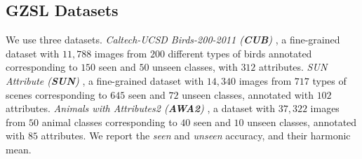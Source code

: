 \subsection{GZSL Datasets}

We use three datasets. \textit{Caltech-UCSD Birds-200-2011 (\textbf{CUB})} \cite{CUB}, a fine-grained dataset with $11,788$ images from $200$ different types of birds annotated corresponding to $150$ seen and $50$ unseen classes, with $312$ attributes. \textit{SUN Attribute (\textbf{SUN})} \cite{SUN}, a fine-grained dataset with $14,340$ images from $717$ types of scenes corresponding to $645$ seen and $72$ unseen classes, annotated with $102$ attributes. \textit{Animals with Attributes2 (\textbf{AWA2})} \cite{AWA2}, a dataset with $37,322$ images from $50$ animal classes corresponding to $40$ seen and $10$ unseen classes, annotated with $85$ attributes. We report the \textit{seen} and \textit{unseen} accuracy, and their harmonic mean.

